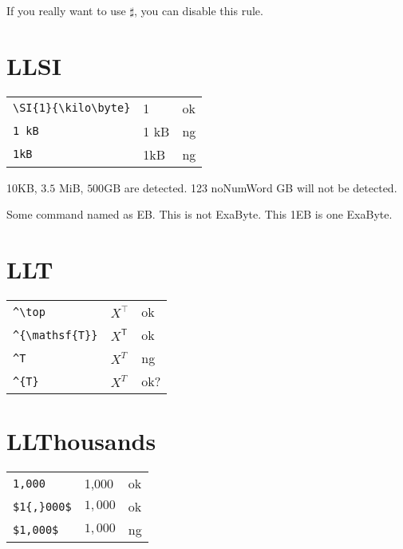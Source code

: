 \documentclass[a4paper]{article}
\newcommand{\tA}[1]{\textcolor{cA}{#1}}
\newcommand{\tC}[1]{\textcolor{cC}{#1}}
\newcommand{\tD}[1]{\textcolor{cD}{#1}}
\begin{document}
If you really want to use $\sharp$, you can disable this rule.

\section{LLSI}

\begin{table}[H]
	\centering
	\begin{tabular}{lll}
		\verb|\SI{1}{\kilo\byte}| & \SI{1}{\kilo\byte} & \tA{ok} \\
		\verb|1 kB|               & 1 kB               & \tD{ng} \\
		\verb|1kB|                & 1kB                & \tD{ng} \\
	\end{tabular}
\end{table}

\newcommand{\EB}{Some command named as EB}

10KB, $3.5$ MiB, $500 \mathrm{GB}$ are detected. 123 noNumWord GB will not be detected.

\EB. This is not ExaByte. This 1EB is one ExaByte.

\section{LLT}

\begin{table}[H]
	\centering
	\begin{tabular}{lll}
		\verb|^\top|         & $X^\top$         & \tA{ok}  \\
		\verb|^{\mathsf{T}}| & $X^{\mathsf{T}}$ & \tA{ok}  \\
		\verb|^T|            & $X^T$            & \tD{ng}  \\
		\verb|^{T}|          & $X^{T}$          & \tC{ok?} \\
	\end{tabular}
\end{table}

\section{LLThousands}

\begin{table}[H]
	\centering
	\begin{tabular}{lll}
		\verb|1,000|     & 1,000     & \tA{ok} \\
		\verb|$1{,}000$| & $1{,}000$ & \tA{ok} \\
		\verb|$1,000$|   & $1,000$   & \tD{ng} \\
	\end{tabular}
\end{table}
\end{document}
